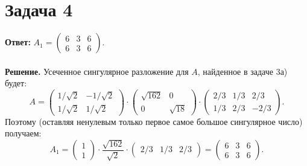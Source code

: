 \documentclass{article}
\begin{document}
\section*{Задача 4}
{\bf Ответ:} $A_1=\left(\begin{array}{rrr}6 & 3 & 6\\6 & 3 & 6\end{array}\right)$.
\\
\\
{\bf Решение.} Усеченное сингулярное разложение для $A$, найденное в задаче 3а) будет:
$$A=\left(\begin{array}{rr}1/\sqrt{2} & -1/\sqrt{2}\\1/\sqrt{2} & 1/\sqrt{2}\end{array}\right)\cdot\left(\begin{array}{rr}\sqrt{162} & 0\\0 & \sqrt{18}\end{array}\right)\cdot\left(\begin{array}{rrr}2/3 & 1/3 & 2/3\\1/3 & 2/3 & -2/3\end{array}\right).$$
Поэтому (оставляя ненулевым только первое самое большое сингулярное число) получаем:
$$A_1 = \left(\begin{array}{r}1\\1\end{array}\right)\cdot\frac{\sqrt{162}}{\sqrt{2}}\cdot\left(\begin{array}{rrr}2/3 & 1/3 & 2/3\end{array}\right)=\left(\begin{array}{rrr}6 & 3 & 6\\6 & 3 & 6\end{array}\right).$$
\end{document}
